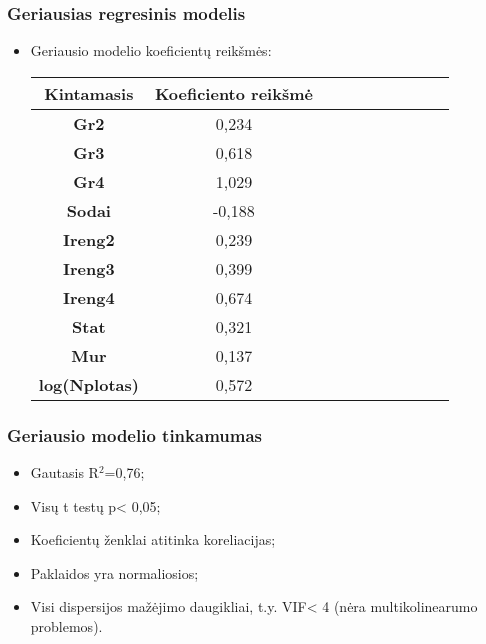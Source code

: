\documentclass[utf8,hyperref={unicode}]{beamer}
\theoremstyle{change}\newtheorem{teorema}{Teiginys}
\theoremstyle{change}\newtheorem{salyga}{}
\begin{document}
\begin{frame}
   \frametitle{Geriausias regresinis modelis}
\begin{itemize}
         \item Geriausio modelio koeficientų reikšmės:
\begin{table}
\begin{tabular}{|c|c|c|c|c|c|c|c|c|c|}
  \hline
\textbf{Kintamasis} & \textbf{Koeficiento reikšmė}\\ \hline
\textbf{Gr2} & 0,234\\ \hline
\textbf{Gr3}& 0,618\\ \hline
\textbf{Gr4}& 1,029\\ \hline
\textbf{Sodai}& -0,188\\ \hline
\textbf{Ireng2}& 0,239\\ \hline
\textbf{Ireng3}& 0,399\\ \hline
\textbf{Ireng4}& 0,674\\ \hline
\textbf{Stat}& 0,321\\ \hline
\textbf{Mur}&0,137\\ \hline
\textbf{log(Nplotas)}& 0,572\\ \hline
\end{tabular}
\end{table}
\end{itemize}
\end{frame}

\begin{frame}
 \frametitle{Geriausio modelio tinkamumas}
\begin{itemize}
           \item Gautasis R$^2$=0,76;
          \item Visų t testų p< 0,05;
          \item Koeficientų ženklai atitinka koreliacijas;
         \item Paklaidos yra normaliosios;
         \item Visi dispersijos mažėjimo daugikliai, t.y. VIF< 4 (nėra multikolinearumo problemos).
    \end{itemize}
 \end{frame}
\end{document}

